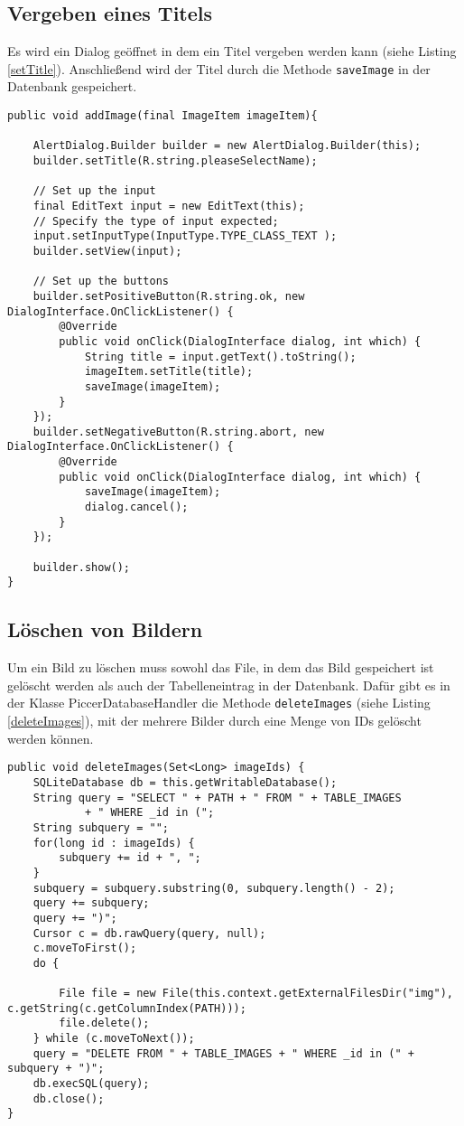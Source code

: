 \subsection{Vergeben eines Titels}
Es wird ein Dialog geöffnet in dem ein Titel vergeben werden kann (siehe Listing \ref{setTitle}). Anschließend wird der Titel durch die Methode \verb+saveImage+ in der Datenbank gespeichert.
\begin{lstlisting}[caption={Titel vergeben}, label=setTitle]
public void addImage(final ImageItem imageItem){

    AlertDialog.Builder builder = new AlertDialog.Builder(this);
    builder.setTitle(R.string.pleaseSelectName);

    // Set up the input
    final EditText input = new EditText(this);
    // Specify the type of input expected;
    input.setInputType(InputType.TYPE_CLASS_TEXT );
    builder.setView(input);

    // Set up the buttons
    builder.setPositiveButton(R.string.ok, new DialogInterface.OnClickListener() {
        @Override
        public void onClick(DialogInterface dialog, int which) {
            String title = input.getText().toString();
            imageItem.setTitle(title);
            saveImage(imageItem);
        }
    });
    builder.setNegativeButton(R.string.abort, new DialogInterface.OnClickListener() {
        @Override
        public void onClick(DialogInterface dialog, int which) {
            saveImage(imageItem);
            dialog.cancel();
        }
    });

    builder.show();
}
\end{lstlisting}
\subsection{Löschen von Bildern}
Um ein Bild zu löschen muss sowohl das File, in dem das Bild gespeichert ist gelöscht
werden als auch der Tabelleneintrag in der Datenbank.
Dafür gibt es in der Klasse PiccerDatabaseHandler die Methode \verb+deleteImages+ (siehe Listing \ref{deleteImages}), mit der mehrere Bilder durch eine Menge von IDs gelöscht werden können.
\begin{lstlisting}[caption={Löschen mehrerer Bilder}, label=deleteImages]
public void deleteImages(Set<Long> imageIds) {
    SQLiteDatabase db = this.getWritableDatabase();
    String query = "SELECT " + PATH + " FROM " + TABLE_IMAGES
            + " WHERE _id in (";
    String subquery = "";
    for(long id : imageIds) {
        subquery += id + ", ";
    }
    subquery = subquery.substring(0, subquery.length() - 2);
    query += subquery;
    query += ")";
    Cursor c = db.rawQuery(query, null);
    c.moveToFirst();
    do {

        File file = new File(this.context.getExternalFilesDir("img"), c.getString(c.getColumnIndex(PATH)));
        file.delete();
    } while (c.moveToNext());
    query = "DELETE FROM " + TABLE_IMAGES + " WHERE _id in (" + subquery + ")";
    db.execSQL(query);
    db.close();
}
\end{lstlisting}

